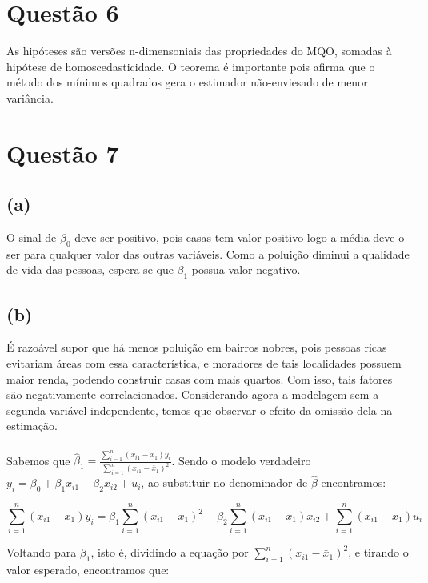 \documentclass[12pt]{article}
\begin{document}
\section*{Questão 6}
As hipóteses são versões n-dimensoniais das propriedades do MQO, somadas à hipótese de homoscedasticidade. O teorema é importante pois afirma que o método dos mínimos quadrados gera o estimador não-enviesado de menor variância.

\section*{Questão 7}

\subsection*{(a)}
O sinal de $\beta_0$ deve ser positivo, pois casas tem valor positivo logo a média deve o ser para qualquer valor das outras variáveis. Como a poluição diminui a qualidade de vida das pessoas, espera-se que $\beta_1$ possua valor negativo.

\subsection*{(b)}
É razoável supor que há menos poluição em bairros nobres, pois pessoas ricas evitariam áreas com essa característica, e moradores de tais localidades possuem maior renda, podendo construir casas com mais quartos. Com isso, tais fatores são negativamente correlacionados. Considerando agora a modelagem sem a segunda variável independente, temos que observar o efeito da omissão dela na estimação.\\\\

Sabemos que $\hat{\beta}_{1}=\frac
{\sum_{i=1}^{n}(x_{i1}-\bar{x}_{1})y_{i}}
{\sum_{i=1}^{n}(x_{i1}-\bar{x}_1)^{2}}$.
Sendo o modelo verdadeiro $y_{i}=\beta_{0}+\beta_{1}x_{i1}+\beta_{2}x_{i2}+u_{i}$, ao substituir no denominador de $\hat{\beta}$ encontramos:

\begin{equation*}
	\sum_{i=1}^{n}(x_{i1}-\bar{x}_{1})y_{i}=
	\beta_{1} \sum_{i=1}^{n}(x_{i1}-\bar{x}_{1})^{2}+
	\beta_{2} \sum_{i=1}^{n}(x_{i1}-\bar{x}_{1})x_{i2}+
	\sum_{i=1}^{n}(x_{i1}-\bar{x}_{1})u_{i}
\end{equation*}

Voltando para $\beta_{1}$, isto é, dividindo a equação por $\sum_{i=1}^{n}(x_{i1}-\bar{x}_1)^{2}$, e tirando o valor esperado, encontramos que:
\end{document}
